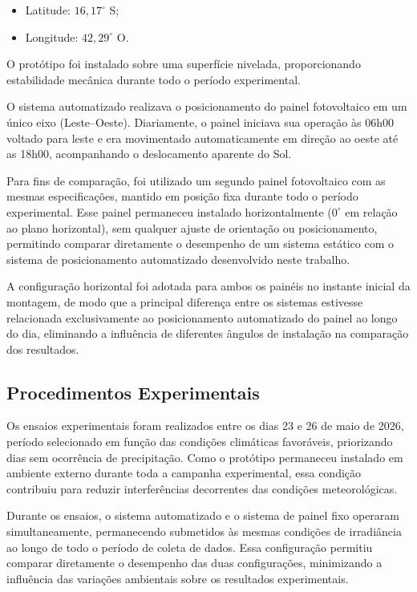 \begin{itemize}
    \item Latitude: $16,17^\circ$ S;
    \item Longitude: $42,29^\circ$ O.
\end{itemize}

O protótipo foi instalado sobre uma superfície nivelada, proporcionando estabilidade mecânica durante todo o período experimental.

O sistema automatizado realizava o posicionamento do painel fotovoltaico em um único eixo (Leste--Oeste). Diariamente, o painel iniciava sua operação às 06h00 voltado para leste e era movimentado automaticamente em direção ao oeste até as 18h00, acompanhando o deslocamento aparente do Sol.

Para fins de comparação, foi utilizado um segundo painel fotovoltaico com as mesmas especificações, mantido em posição fixa durante todo o período experimental. Esse painel permaneceu instalado horizontalmente ($0^\circ$ em relação ao plano horizontal), sem qualquer ajuste de orientação ou posicionamento, permitindo comparar diretamente o desempenho de um sistema estático com o sistema de posicionamento automatizado desenvolvido neste trabalho.

A configuração horizontal foi adotada para ambos os painéis no instante inicial da montagem, de modo que a principal diferença entre os sistemas estivesse relacionada exclusivamente ao posicionamento automatizado do painel ao longo do dia, eliminando a influência de diferentes ângulos de instalação na comparação dos resultados.

\subsection{Procedimentos Experimentais}

Os ensaios experimentais foram realizados entre os dias 23 e 26 de maio de 2026, período selecionado em função das condições climáticas favoráveis, priorizando dias sem ocorrência de precipitação. Como o protótipo permaneceu instalado em ambiente externo durante toda a campanha experimental, essa condição contribuiu para reduzir interferências decorrentes das condições meteorológicas.

Durante os ensaios, o sistema automatizado e o sistema de painel fixo operaram simultaneamente, permanecendo submetidos às mesmas condições de irradiância ao longo de todo o período de coleta de dados. Essa configuração permitiu comparar diretamente o desempenho das duas configurações, minimizando a influência das variações ambientais sobre os resultados experimentais.

